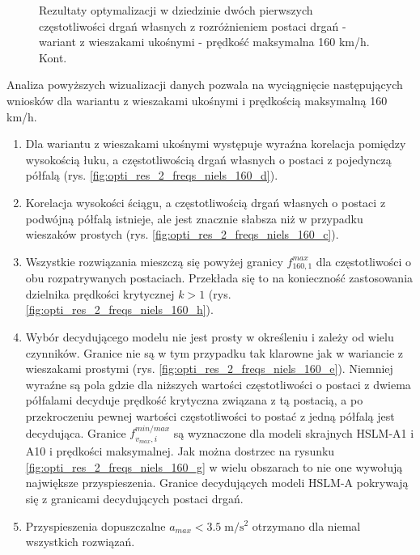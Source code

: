 \begin{figure}[H]\ContinuedFloat
	\centering
	\caption{Rezultaty optymalizacji w dziedzinie dwóch pierwszych częstotliwości drgań własnych z rozróżnieniem postaci drgań - wariant z wieszakami ukośnymi - prędkość maksymalna 160 km/h. Kont.}
	
\end{figure}
Analiza powyższych wizualizacji danych pozwala na wyciągnięcie następujących wniosków dla wariantu z wieszakami ukośnymi i prędkością maksymalną 160 km/h.
\begin{enumerate}
	
	\item Dla wariantu z wieszakami ukośnymi występuje wyraźna korelacja pomiędzy wysokością łuku, a częstotliwością drgań własnych o postaci z pojedynczą półfalą (rys. \ref{fig:opti_res_2_freqs_niels_160_d}).
	\item Korelacja wysokości ściągu, a częstotliwością drgań własnych o postaci z podwójną półfalą istnieje, ale jest znacznie słabsza niż w przypadku wieszaków prostych (rys. \ref{fig:opti_res_2_freqs_niels_160_c}).
	\item Wszystkie rozwiązania mieszczą się powyżej granicy $f_{160,1}^{max}$ dla częstotliwości o obu rozpatrywanych postaciach. Przekłada się to na konieczność zastosowania dzielnika prędkości krytycznej $k>1$ (rys. \ref{fig:opti_res_2_freqs_niels_160_h}).
	\item Wybór decydującego modelu nie jest prosty w określeniu i zależy od wielu czynników. Granice nie są w tym przypadku tak klarowne jak w wariancie z wieszakami prostymi (rys. \ref{fig:opti_res_2_freqs_niels_160_e}). Niemniej wyraźne są pola gdzie dla niższych wartości częstotliwości o postaci z dwiema półfalami decyduje prędkość krytyczna związana z tą postacią, a po przekroczeniu pewnej wartości częstotliwości to postać z jedną półfalą jest decydująca. Granice $f_{v_{max},i}^{min/max}$ są wyznaczone dla modeli skrajnych HSLM-A1 i A10 i prędkości maksymalnej. Jak można dostrzec na rysunku \ref{fig:opti_res_2_freqs_niels_160_g} w wielu obszarach to nie one wywołują największe przyspieszenia. Granice decydujących modeli HSLM-A pokrywają się z granicami decydujących postaci drgań.
	\item Przyspieszenia dopuszczalne $a_{max}<3.5\;\mathrm{m/s^2}$ otrzymano dla niemal wszystkich rozwiązań.
	
\end{enumerate}
\vfill


